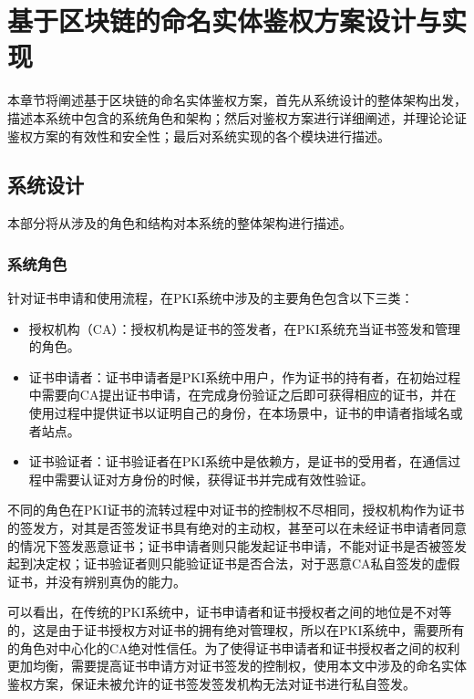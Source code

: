 
\chapter{基于区块链的命名实体鉴权方案设计与实现}

本章节将阐述基于区块链的命名实体鉴权方案，首先从系统设计的整体架构出发，描述本系统中包含的系统角色和架构；然后对鉴权方案进行详细阐述，并理论论证鉴权方案的有效性和安全性；最后对系统实现的各个模块进行描述。


\section{系统设计}

本部分将从涉及的角色和结构对本系统的整体架构进行描述。

\subsection{系统角色}

针对证书申请和使用流程，在PKI系统中涉及的主要角色包含以下三类：
\begin{itemize}
	\item 授权机构（CA）：授权机构是证书的签发者，在PKI系统充当证书签发和管理的角色。
	\item 证书申请者：证书申请者是PKI系统中用户，作为证书的持有者，在初始过程中需要向CA提出证书申请，在完成身份验证之后即可获得相应的证书，并在使用过程中提供证书以证明自己的身份，在本场景中，证书的申请者指域名或者站点。
	\item 证书验证者：证书验证者在PKI系统中是依赖方，是证书的受用者，在通信过程中需要认证对方身份的时候，获得证书并完成有效性验证。
\end{itemize}

不同的角色在PKI证书的流转过程中对证书的控制权不尽相同，授权机构作为证书的签发方，对其是否签发证书具有绝对的主动权，甚至可以在未经证书申请者同意的情况下签发恶意证书；证书申请者则只能发起证书申请，不能对证书是否被签发起到决定权；证书验证者则只能验证证书是否合法，对于恶意CA私自签发的虚假证书，并没有辨别真伪的能力。

可以看出，在传统的PKI系统中，证书申请者和证书授权者之间的地位是不对等的，这是由于证书授权方对证书的拥有绝对管理权，所以在PKI系统中，需要所有的角色对中心化的CA绝对性信任。为了使得证书申请者和证书授权者之间的权利更加均衡，需要提高证书申请方对证书签发的控制权，使用本文中涉及的命名实体鉴权方案，保证未被允许的证书签发签发机构无法对证书进行私自签发。


